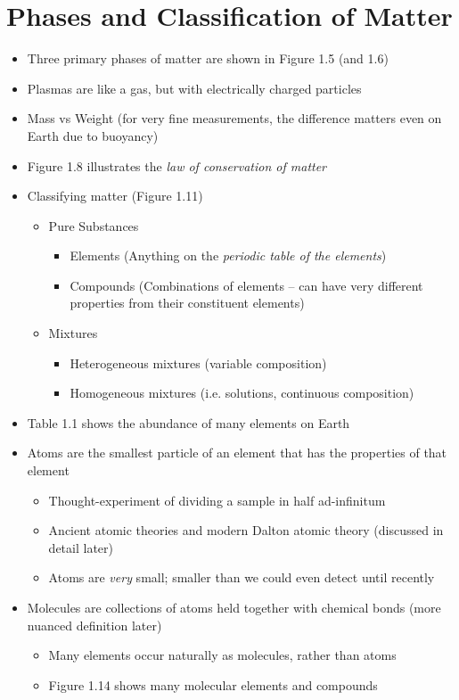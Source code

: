 \documentclass[12pt, openany, letterpaper]{memoir}
\begin{document}
\section{Phases and Classification of Matter}
\begin{itemize}
  \item Three primary phases of matter are shown in Figure 1.5 (and 1.6)
  \item Plasmas are like a gas, but with electrically charged particles
  \item Mass vs Weight (for very fine measurements, the difference matters even on Earth due to buoyancy)
  \item Figure 1.8 illustrates the \emph{law of conservation of matter}
  \item Classifying matter (Figure 1.11)
  \begin{itemize}
    \item Pure Substances
    \begin{itemize}
      \item Elements (Anything on the \emph{periodic table of the elements})
      \item Compounds (Combinations of elements -- can have very different properties from their constituent elements)
    \end{itemize}
    \item Mixtures
    \begin{itemize}
      \item Heterogeneous mixtures (variable composition)
      \item Homogeneous mixtures (i.e. solutions, continuous composition)
    \end{itemize}
  \end{itemize}
  \item Table 1.1 shows the abundance of many elements on Earth
  \item Atoms are the smallest particle of an element that has the properties of that element
  \begin{itemize}
    \item Thought-experiment of dividing a sample in half ad-infinitum
    \item Ancient atomic theories and modern Dalton atomic theory (discussed in detail later)
    \item Atoms are \emph{very} small; smaller than we could even detect until recently
  \end{itemize}
  \item Molecules are collections of atoms held together with chemical bonds (more nuanced definition later)
    \begin{itemize}
      \item Many elements occur naturally as molecules, rather than atoms
      \item Figure 1.14 shows many molecular elements and compounds
    \end{itemize}
\end{itemize}
\end{document}
